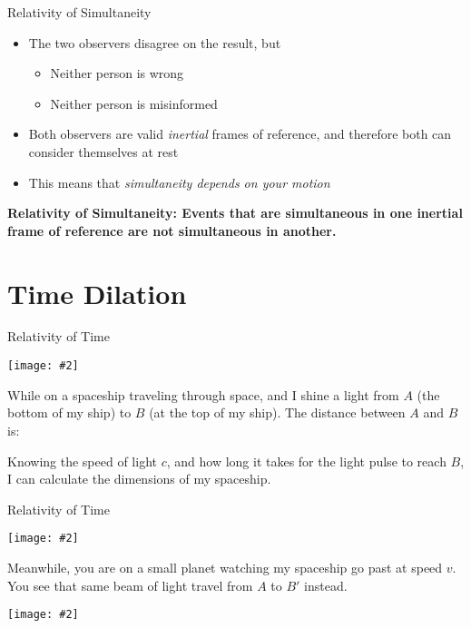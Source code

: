 \documentclass[12pt,compress,aspectratio=169]{beamer}
\newcommand{\pic}[2]{\texttt{[image: \#2]}}
\newcommand{\eq}[2]{\vspace{#1}{\Large\begin{displaymath}#2\end{displaymath}}}
\begin{document}
\begin{frame}{Relativity of Simultaneity}
  \begin{itemize}
  \item The two observers disagree on the result, but
    \begin{itemize}
    \item Neither person is wrong
    \item Neither person is misinformed
    \end{itemize}
  \item Both observers are valid \emph{inertial} frames of reference, and
    therefore both can consider themselves at rest
  \item This means that \emph{simultaneity depends on your motion}
  \end{itemize}
  
  \vspace{.2in}\textbf{Relativity of Simultaneity: Events that are simultaneous
    in one inertial frame of reference are not simultaneous in another.}
\end{frame}



\section{Time Dilation}

\begin{frame}{Relativity of Time}
  \begin{center}
    \pic{.7}{graphics/spaceship.png}
  \end{center}

  \vspace{-.2in}While on a spaceship traveling through space, and I shine a
  light from $A$ (the bottom of my ship) to $B$ (at the top of my ship). The
  distance between $A$ and $B$ is:

  \eq{-.45in}{
      |AB|=ct
  }

  \vspace{-.2in}Knowing the speed of light $c$, and how long it takes for the
  light pulse to reach $B$, I can calculate the dimensions of my spaceship.
\end{frame}


\begin{frame}{Relativity of Time}
  \begin{center}
    \pic{.7}{graphics/spaceship.png}
  \end{center}
  Meanwhile, you are on a small planet watching my spaceship go past at speed
  $v$. You see that same beam of light travel from $A$ to $B'$ instead.
  \begin{center}
    \pic{.7}{graphics/light-a-b-prime.png}
  \end{center}
\end{frame}
\end{document}
